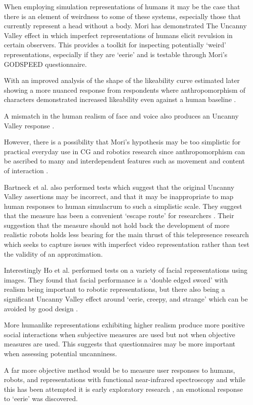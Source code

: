 When employing simulation representations of humans it may be the case that there is an element of weirdness to some of these systems, especially those that currently represent a head without a body. Mori has demonstrated The Uncanny Valley \cite{Mori1970} effect in which imperfect representations of humans elicit revulsion in certain observers. This provides a toolkit for inspecting potentially `weird' representations, especially if they are `eerie' and is testable through Mori's GODSPEED questionnaire. \par
                    With an improved analysis of the shape of the likeability curve estimated later showing a more nuanced response from respondents where anthropomorphism of characters demonstrated increased likeability even against a human baseline \cite{Bartneck2007, Bartneck2009}.\par
                    A mismatch in the human realism of face and voice also produces an Uncanny Valley response \cite{Mitchell2011}.\par
                    However, there is a possibility that Mori's hypothesis may be too simplistic for practical everyday use in CG and robotics research since anthropomorphism can be ascribed to many and interdependent features such as movement and content of interaction \cite{Bartneck2009}.\par
                    Bartneck et al. also performed tests which suggest that the original Uncanny Valley assertions may be incorrect, and that it may be inappropriate to map human responses to human simulacrum to such a simplistic scale. They suggest that the measure has been a convenient `escape route' for researchers \cite{Bartneck2009}. Their suggestion that the measure should not hold back the development of more realistic robots holds less bearing for the main thrust of this telepresence research which seeks to capture issues with imperfect video representation rather than test the validity of an approximation.\par
                    Interestingly Ho et al. performed tests on a variety of facial representations using images.  They found that facial performance is a `double edged sword' with realism being important to robotic representations, but there also being a significant Uncanny Valley effect around `eerie, creepy, and strange' which can be avoided by good design \cite{Ho2008}.\par
                    More humanlike representations exhibiting higher realism produce more positive social interactions when subjective measures are used \cite{Yee2007} but not when objective measures are used. This suggests that questionnaires may be more important when assessing potential uncanniness.\par
                    A far more objective method would be to measure user responses to humans, robots, and representations with functional near-infrared spectroscopy and while this has been attempted it is early exploratory research \cite{Strait2014}, an emotional response to `eerie' was discovered.\par
                    
